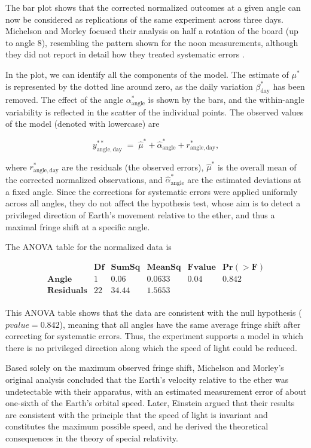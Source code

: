 \documentclass[
]{book}
\begin{document}
The bar plot shows that the corrected normalized outcomes at a given angle can now be considered as replications of the same experiment across three days. Michelson and Morley focused their analysis on half a rotation of the board (up to angle 8), resembling the pattern shown for the noon measurements, although they did not report in detail how they treated systematic errors \citep{handschy1982reexamination}.

In the plot, we can identify all the components of the model. The estimate of \(\mu^*\) is represented by the dotted line around zero, as the daily variation \(\beta^*_{\text{day}}\) has been removed. The effect of the angle \(\alpha^*_{\text{angle}}\) is shown by the bars, and the within-angle variability is reflected in the scatter of the individual points. The observed values of the model (denoted with lowercase) are

\[
y^{**}_{\text{angle}, \,\text{day}} \;=\; \hat{\mu}^* + \hat{\alpha}^*_{\text{angle}} + r^*_{\text{angle}, \,\text{day}} ,
\]

where \(r^*_{\text{angle}, \,\text{day}}\) are the residuals (the observed errors), \(\hat{\mu}^*\) is the overall mean of the corrected normalized observations, and \(\hat{\alpha}^*_{\text{angle}}\) are the estimated deviations at a fixed angle. Since the corrections for systematic errors were applied uniformly across all angles, they do not affect the hypothesis test, whose aim is to detect a privileged direction of Earth's movement relative to the ether, and thus a maximal fringe shift at a specific angle.

The ANOVA table for the normalized data is

\[
\begin{array}{cccccc}
&\mathbf{Df} & \mathbf{Sum Sq} & \mathbf{Mean Sq} & \mathbf{F value} & \mathbf{Pr(>F)} \\ 
\mathbf{Angle}     &     1  & 0.06  & 0.0633    & 0.04  & 0.842 \\
\mathbf{Residuals} &   22 & 34.44 & 1.5653 & &\\
\end{array}
\]

This ANOVA table shows that the data are consistent with the null hypothesis (\(pvalue = 0.842\)), meaning that all angles have the same average fringe shift after correcting for systematic errors. Thus, the experiment supports a model in which there is no privileged direction along which the speed of light could be reduced.

Based solely on the maximum observed fringe shift, Michelson and Morley's original analysis concluded that the Earth's velocity relative to the ether was undetectable with their apparatus, with an estimated measurement error of about one-sixth of the Earth's orbital speed. Later, Einstein argued that their results are consistent with the principle that the speed of light is invariant and constitutes the maximum possible speed, and he derived the theoretical consequences in the theory of special relativity.
\end{document}
